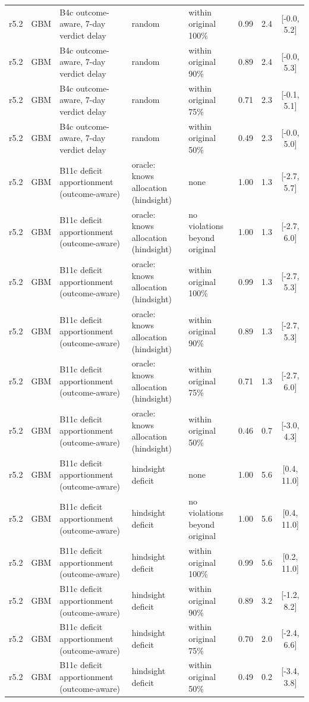 \begin{longtable}{lllp{4.2cm}p{3.4cm}ccc}
r5.2 & GBM & B4c outcome-aware, 7-day verdict delay & random & within original 100\% & 0.99 & 2.4 & [-0.0, 5.2] \\
r5.2 & GBM & B4c outcome-aware, 7-day verdict delay & random & within original 90\% & 0.89 & 2.4 & [-0.0, 5.3] \\
r5.2 & GBM & B4c outcome-aware, 7-day verdict delay & random & within original 75\% & 0.71 & 2.3 & [-0.1, 5.1] \\
r5.2 & GBM & B4c outcome-aware, 7-day verdict delay & random & within original 50\% & 0.49 & 2.3 & [-0.0, 5.0] \\
r5.2 & GBM & B11c deficit apportionment (outcome-aware) & oracle: knows allocation (hindsight) & none & 1.00 & 1.3 & [-2.7, 5.7] \\
r5.2 & GBM & B11c deficit apportionment (outcome-aware) & oracle: knows allocation (hindsight) & no violations beyond original & 1.00 & 1.3 & [-2.7, 6.0] \\
r5.2 & GBM & B11c deficit apportionment (outcome-aware) & oracle: knows allocation (hindsight) & within original 100\% & 0.99 & 1.3 & [-2.7, 5.3] \\
r5.2 & GBM & B11c deficit apportionment (outcome-aware) & oracle: knows allocation (hindsight) & within original 90\% & 0.89 & 1.3 & [-2.7, 5.3] \\
r5.2 & GBM & B11c deficit apportionment (outcome-aware) & oracle: knows allocation (hindsight) & within original 75\% & 0.71 & 1.3 & [-2.7, 6.0] \\
r5.2 & GBM & B11c deficit apportionment (outcome-aware) & oracle: knows allocation (hindsight) & within original 50\% & 0.46 & 0.7 & [-3.0, 4.3] \\
r5.2 & GBM & B11c deficit apportionment (outcome-aware) & hindsight deficit & none & 1.00 & 5.6 & [0.4, 11.0] \\
r5.2 & GBM & B11c deficit apportionment (outcome-aware) & hindsight deficit & no violations beyond original & 1.00 & 5.6 & [0.4, 11.0] \\
r5.2 & GBM & B11c deficit apportionment (outcome-aware) & hindsight deficit & within original 100\% & 0.99 & 5.6 & [0.2, 11.0] \\
r5.2 & GBM & B11c deficit apportionment (outcome-aware) & hindsight deficit & within original 90\% & 0.89 & 3.2 & [-1.2, 8.2] \\
r5.2 & GBM & B11c deficit apportionment (outcome-aware) & hindsight deficit & within original 75\% & 0.70 & 2.0 & [-2.4, 6.6] \\
r5.2 & GBM & B11c deficit apportionment (outcome-aware) & hindsight deficit & within original 50\% & 0.49 & 0.2 & [-3.4, 3.8] \\

\end{longtable}
